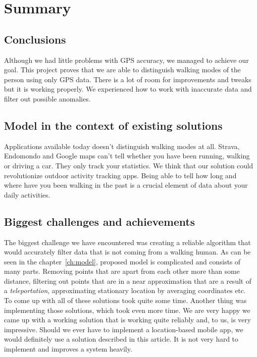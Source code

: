 \chapter{Summary}

\section{Conclusions}
Although we had little problems with GPS accuracy, we managed to achieve our goal. This project proves that we are able to distinguish walking modes of the person using only GPS data. There is a lot of room for improvements and tweaks but it is working properly. We experienced how to work with inaccurate data and filter out possible anomalies.

\section{Model in the context of existing solutions}
Applications available today doesn't distinguish walking modes at all. Strava, Endomondo and Google maps can't tell whether you have been running, walking or driving a car. They only track your statistics. We think that our solution could revolutionize outdoor activity tracking apps. Being able to tell how long and where have you been walking in the past is a crucial element of data about your daily activities.

\section{Biggest challenges and achievements}
The biggest challenge we have encountered was creating a reliable algorithm that would accurately filter data that is not coming from a walking human. As can be seen in the chapter~\ref{ch:model}, proposed model is complicated and consists of many parts. Removing points that are apart from each other more than some distance, filtering out points that are in a near approximation that are a result of a \textit{teleportation}, approximating stationary location by averaging coordinates etc. To come up with all of these solutions took quite some time. Another thing was implementing those solutions, which took even more time. We are very happy we came up with a working solution that is working quite reliably and, to us, is very impressive. Should we ever have to implement a location-based mobile app, we would definitely use a solution described in this article. It is not very hard to implement and improves a system heavily.

